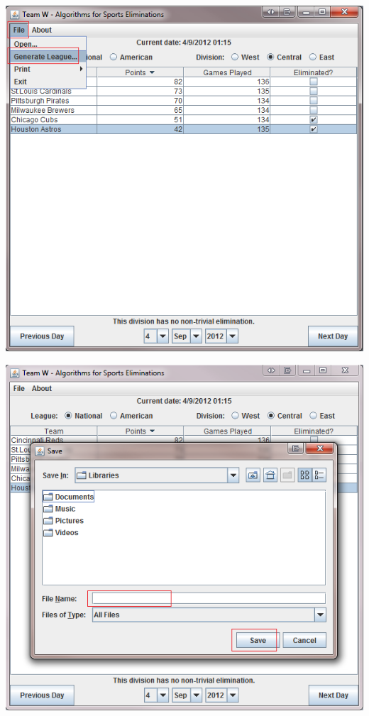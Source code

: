 \includegraphics[width=\linewidth,height=\measurepage,keepaspectratio]
{images/userManualDesk7.png}

\includegraphics[width=\linewidth,keepaspectratio]{images/userManualDesk8.png}

